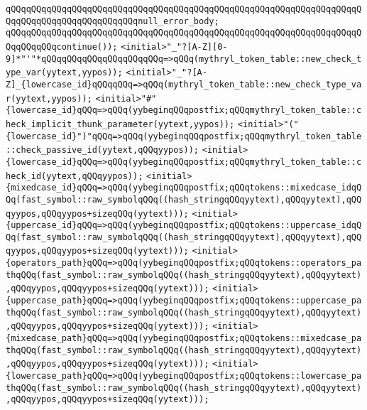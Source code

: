 \verb|qQQqqQQqqQQqqQQqqQQqqQQqqQQqqQQqqQQqqQQqqQQqqQQqqQQqqQQqqQQqqQQqqQQqqQQqqQQqqQQqqQQqqQQqqQQqqQQqnull_error_body;|\newline
\verb|qQQqqQQqqQQqqQQqqQQqqQQqqQQqqQQqqQQqqQQqqQQqqQQqqQQqqQQqqQQqqQQqqQQqqQQqqQQqqQQqcontinue());|\newline
\verb|<initial>"_"?[A-Z][0-9]*"'"*qQQqqQQqqQQqqQQqqQQqqQQq=>qQQq(mythryl_token_table::new_check_type_var(yytext,yypos));|\newline
\verb|<initial>"_"?[A-Z]_{lowercase_id}qQQqqQQq=>qQQq(mythryl_token_table::new_check_type_var(yytext,yypos));|\newline
\verb|<initial>"#"{lowercase_id}qQQq=>qQQq(yybeginqQQqpostfix;qQQqmythryl_token_table::check_implicit_thunk_parameter(yytext,yypos));|\newline
\verb|<initial>"("{lowercase_id}")"qQQq=>qQQq(yybeginqQQqpostfix;qQQqmythryl_token_table::check_passive_id(yytext,qQQqyypos));|\newline
\verb|<initial>{lowercase_id}qQQq=>qQQq(yybeginqQQqpostfix;qQQqmythryl_token_table::check_id(yytext,qQQqyypos));|\newline
\verb|<initial>{mixedcase_id}qQQq=>qQQq(yybeginqQQqpostfix;qQQqtokens::mixedcase_idqQQq(fast_symbol::raw_symbolqQQq((hash_stringqQQqyytext),qQQqyytext),qQQqyypos,qQQqyypos+sizeqQQq(yytext)));|\newline
\verb|<initial>{uppercase_id}qQQq=>qQQq(yybeginqQQqpostfix;qQQqtokens::uppercase_idqQQq(fast_symbol::raw_symbolqQQq((hash_stringqQQqyytext),qQQqyytext),qQQqyypos,qQQqyypos+sizeqQQq(yytext)));|\newline
\verb|<initial>{operators_path}qQQq=>qQQq(yybeginqQQqpostfix;qQQqtokens::operators_pathqQQq(fast_symbol::raw_symbolqQQq((hash_stringqQQqyytext),qQQqyytext),qQQqyypos,qQQqyypos+sizeqQQq(yytext)));|\newline
\verb|<initial>{uppercase_path}qQQq=>qQQq(yybeginqQQqpostfix;qQQqtokens::uppercase_pathqQQq(fast_symbol::raw_symbolqQQq((hash_stringqQQqyytext),qQQqyytext),qQQqyypos,qQQqyypos+sizeqQQq(yytext)));|\newline
\verb|<initial>{mixedcase_path}qQQq=>qQQq(yybeginqQQqpostfix;qQQqtokens::mixedcase_pathqQQq(fast_symbol::raw_symbolqQQq((hash_stringqQQqyytext),qQQqyytext),qQQqyypos,qQQqyypos+sizeqQQq(yytext)));|\newline
\verb|<initial>{lowercase_path}qQQq=>qQQq(yybeginqQQqpostfix;qQQqtokens::lowercase_pathqQQq(fast_symbol::raw_symbolqQQq((hash_stringqQQqyytext),qQQqyytext),qQQqyypos,qQQqyypos+sizeqQQq(yytext)));|\newline
